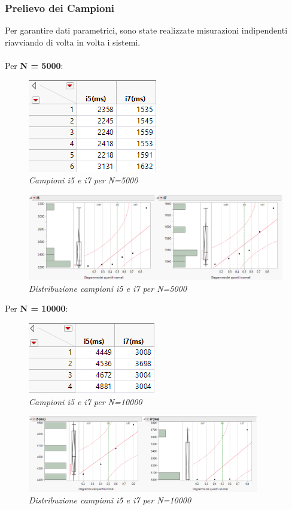 \subsubsection{Prelievo dei Campioni}
Per garantire dati parametrici, sono state realizzate misurazioni indipendenti riavviando di volta in volta i sistemi.
\\ 
\\ Per \textbf{N = 5000}:
\begin{figure}[H]
	\centering
	\includegraphics{img/hw0/5000.png}
	\caption{\textit{Campioni i5 e i7 per N=5000}}
\end{figure}
\begin{figure}[H]
	\centering
	\includegraphics[width=1.1\textwidth]{img/hw0/5000distr.png}
	\caption{\textit{Distribuzione campioni i5 e i7 per N=5000}}
\end{figure}
\newpage
Per \textbf{N = 10000}:
\begin{figure}[H]
	\centering
	\includegraphics{img/hw0/10000.png}
	\caption{\textit{Campioni i5 e i7 per N=10000}}
\end{figure}
\begin{figure}[H]
	\centering
	\includegraphics[width=0.9\textwidth]{img/hw0/10000distr.png}
	\caption{\textit{Distribuzione campioni i5 e i7 per N=10000}}
\end{figure}


